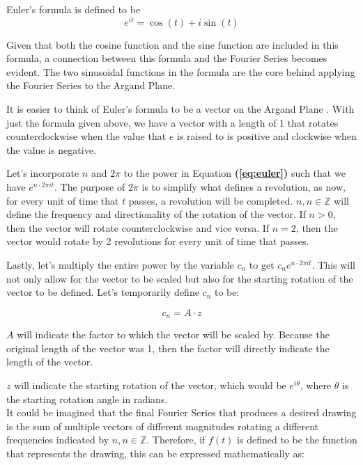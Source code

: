 \documentclass[letterpaper, 12pt]{article}
\begin{document}
Euler's formula is defined to be
\begin{equation}
    e^{it} = \cos(t) + i\sin(t)
    \label{eq:euler}
\end{equation}

Given that both the cosine function and the sine function are included in this
formula, a connection between this formula and the Fourier Series becomes evident.
The two sinusoidal functions in the formula are the core behind applying the
Fourier Series to the Argand Plane.

It is easier to think of Euler's formula to be a vector on the Argand Plane \cite{sandersonWhatFourierSeries2019}.
With just the formula given above, we have a vector with a length of 1 that rotates
counterclockwise when the value that \(e\) is raised to is positive and
clockwise when the value is negative.

Let's incorporate \(n\) and \(2\pi\) to the power in Equation \textbf{(\ref*{eq:euler})} such
that we have \(e^{n \cdot 2\pi it}\). The purpose of \(2\pi\) is to
simplify what defines a revolution, as now, for every unit of time that
\(t\) passes, a revolution will be completed. \(n, n \in \mathbb{Z}\) will define the frequency
and directionality of the rotation of the vector. If \(n > 0\), then the vector
will rotate counterclockwise and vice versa. If \(n = 2\), then the vector would
rotate by 2 revolutions for every unit of time that passes.

Lastly, let's multiply the entire power by the variable \(c_n\) to get \(c_n e^{n \cdot 2\pi it}\). This will not
only allow for the vector to be scaled but also for the starting rotation of
the vector to be defined. Let's temporarily define \(c_n\) to be:

\begin{equation*}
    c_n = A \cdot z
\end{equation*}

\(A\) will indicate the factor to which the vector will be scaled by. Because
the original length of the vector was 1, then the factor will directly indicate
the length of the vector.

\(z\) will indicate the starting rotation of the vector, which would be
\(e^{i\theta}\), where \(\theta\) is the starting rotation angle in radians.
\\

It could be imagined that the final Fourier Series that produces a desired drawing
is the sum of multiple vectors of different magnitudes rotating a different frequencies
indicated by \(n, n \in \mathbb{Z}\). Therefore, if \(f(t)\) is defined to be the
function that represents the drawing, this can be expressed mathematically
as:
\end{document}
